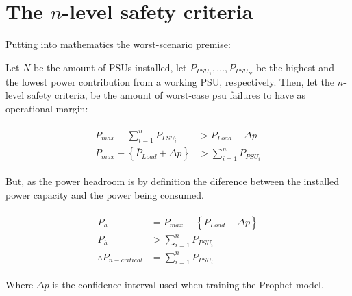 \section{The $n$-level safety criteria}
Putting into mathematics the worst-scenario premise:

Let $N$ be the amount of PSUs installed, let $P_{PSU_1}, \ldots, P_{PSU_N}$ be the highest and the lowest power contribution from a working PSU, respectively. Then, let the $n$-level safety criteria, be the amount of worst-case \ac{psu} failures to have as operational margin:

\begin{align}
\begin{split}
	P_{max} - \sum_{i=1}^{n}{P_{PSU_i}} &> \bar{P}_{Load} + \Delta p \\
	P_{max} - \left\{\bar{P}_{Load} + \Delta p \right\} &> \sum_{i=1}^{n}{P_{PSU_i}}
\end{split}
\end{align}

But, as the power headroom is by definition the diference between the installed power capacity and the power being consumed. 

\begin{align}
	\begin{split}
		P_{h} &= P_{max} - \left\{\bar{P}_{Load} + \Delta p \right\} \\
		P_{h} &> \sum_{i=1}^{n}{P_{PSU_i}} \\
		\therefore P_{n-critical} &= \sum_{i=1}^{n}{P_{PSU_i}}
	\end{split}
\end{align}

Where $\Delta p$ is the confidence interval used when training the Prophet model.



